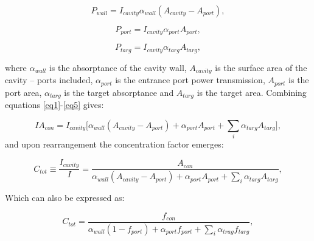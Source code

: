 \documentclass[a4paper]{article}
\begin{document}
\begin{equation}\label{eq3}
P_{wall}=I_{cavity}\alpha_{wall}(A_{cavity}-A_{port}),
\end{equation}

\begin{equation}\label{eq4}
P_{port}=I_{cavity}\alpha_{port}A_{port},
\end{equation}

\begin{equation}\label{eq5}
P_{targ}=I_{cavity}\alpha_{targ}A_{targ},
\end{equation}

\noindent where $\alpha_{wall}$ is the absorptance of the cavity wall, $A_{cavity}$ is the surface area of the cavity – ports included, $\alpha_{port}$ is the entrance port power transmission, $A_{port}$ is the port area, $\alpha_{targ}$ is the target absorptance and $A_{targ}$ is the target area. 
Combining equations \ref{eq1}-\ref{eq5} gives:

\begin{equation}\label{eq6}
IA_{con}=I_{cavity}\Big[\alpha_{wall}(A_{cavity}-A_{port})+\alpha_{port}A_{port}+\sum_{i}\alpha_{targ}A_{targ}\Big],
\end{equation}
\noindent and upon rearrangement the concentration factor emerges:

\begin{equation}\label{eq7}
C_{tot} \equiv \frac{I_{cavity}}{I} = \frac{A_{con}}{\alpha_{wall}(A_{cavity}-A_{port})+\alpha_{port}A_{port} + \sum_{i}\alpha_{targ}A_{targ}},
\end{equation}

\noindent Which can also be expressed as:

\begin{equation}\label{eq8}
C_{tot} = \frac{f_{con}}{\alpha_{wall}(1-f_{port}) + \alpha_{port}f_{port} + \sum_{i}\alpha_{trag}f_{targ}},
\end{equation}
\end{document}
